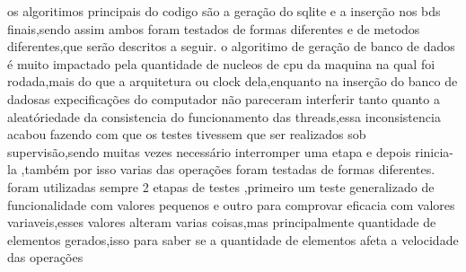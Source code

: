 \documentclass[
	12pt,				%
	openright,			%
	oneside,			%
	a4paper,			%
	english,			%
	french,				%
	spanish,			%
	brazil,				%
	]{abntex2}
\begin{document}
os algoritimos principais do codigo são a geração do sqlite e a inserção nos bds finais,sendo assim ambos foram testados de formas diferentes e de metodos diferentes,que serão descritos a seguir.
o algoritimo de geração de banco de dados é muito impactado pela quantidade de nucleos de cpu da maquina na qual foi rodada,mais do que a arquitetura ou clock dela,enquanto na inserção do banco de dadosas expecificações do computador não pareceram interferir tanto quanto a aleatóriedade da consistencia do funcionamento das threads,essa inconsistencia acabou fazendo com que os testes tivessem que ser realizados sob supervisão,sendo muitas vezes necessário interromper uma etapa e depois rinicia-la ,também por isso varias das operações foram testadas de formas diferentes.
foram utilizadas sempre 2 etapas de testes ,primeiro um teste generalizado de funcionalidade com valores pequenos e outro para comprovar eficacia com valores variaveis,esses valores alteram varias coisas,mas principalmente quantidade de elementos gerados,isso para saber se a quantidade de elementos afeta a velocidade das operações
\end{document}
